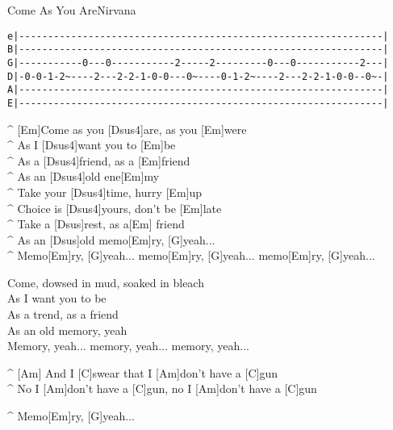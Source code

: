 \begin{song}{Come As You Are}{Nirvana}

{\scriptsize
\begin{verbatim}
e|---------------------------------------------------------------|
B|---------------------------------------------------------------|
G|-----------0---0-----------2-----2---------0---0-----------2---|
D|-0-0-1-2~----2---2-2-1-0-0---0~----0-1-2~----2---2-2-1-0-0--0~-|
A|---------------------------------------------------------------|
E|---------------------------------------------------------------|
\end{verbatim}
}

\begin{guitar}
^ [Em]Come as you [Dsus4]are, as you [Em]were\\
^ As I [Dsus4]want you to [Em]be\\
^ As a [Dsus4]friend, as a [Em]friend\\
^ As an [Dsus4]old ene[Em]my\\
^ Take your [Dsus4]time, hurry [Em]up\\
^ Choice is [Dsus4]yours, don't be [Em]late\\
^ Take a [Dsus]rest, as a[Em] friend\\
^ As an [Dsus]old memo[Em]ry, [G]yeah...\\
^ Memo[Em]ry, [G]yeah... memo[Em]ry, [G]yeah... memo[Em]ry, [G]yeah...\\
\end{guitar}

\begin{guitar}
Come, dowsed in mud, soaked in bleach\\
As I want you to be\\
As a trend, as a friend\\
As an old memory, yeah\\
Memory, yeah... memory, yeah... memory, yeah...\\
\end{guitar}

\begin{guitar}
^ [Am]  And I [C]swear that I [Am]don't have a [C]gun\\
^ No I [Am]don't have a [C]gun, no I [Am]don't have a [C]gun\\
\end{guitar}


\begin{guitar}
^ Memo[Em]ry, [G]yeah...\\
\end{guitar}



\end{song}
